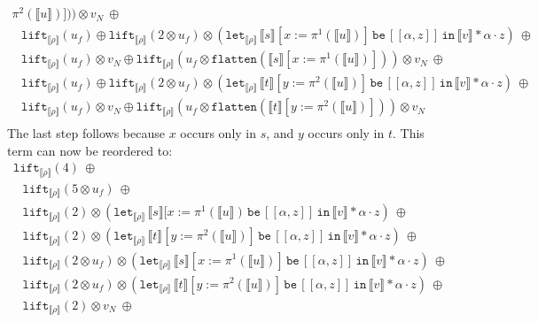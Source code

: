 \documentclass[runningheads,a4paper]{llncs}
\newcommand{\typeinterpret}[1]{\llbracket #1 \rrbracket}
\newcommand{\interpret}[1]{\llbracket #1 \rrbracket}
\newcommand{\expair}[2]{[#1,#2]}
\newcommand{\flatten}{\mathtt{flatten}}
\newcommand{\lift}{\mathtt{lift}}
\newcommand{\xlet}[4]{\mathtt{let}_{#1}\,#2\,\mathtt{be}\,[#3]\,\mathtt{in}\,#4}
\begin{document}
\begin{itemize}
\[\begin{array}{l}
    \pi^2(\interpret{u})])) \otimes v_N\ \oplus \\
  \phantom{A}
  \lift_{\typeinterpret{\rho}}(u_f) \oplus
    \lift_{\typeinterpret{\rho}}(2 \otimes u_f) \otimes
    (\xlet{\typeinterpret{\rho}}{\interpret{s}[x:=\pi^1(
    \interpret{u})]}{\expair{\alpha}{z}}{
      \interpret{v} * \alpha \cdot z})\ \oplus \\
  \phantom{A}
  \lift_{\typeinterpret{\rho}}(u_f) \otimes v_N \oplus
    \lift_{\typeinterpret{\rho}}(u_f \otimes
    \flatten(\interpret{s}[x:=\pi^1(\interpret{u})])) \otimes v_N\ 
    \oplus \\
  \phantom{A}
  \lift_{\typeinterpret{\rho}}(u_f) \oplus
    \lift_{\typeinterpret{\rho}}(2 \otimes u_f) \otimes
    (\xlet{\typeinterpret{\rho}}{\interpret{t}[y:=\pi^2(
    \interpret{u})]}{\expair{\alpha}{z}}{\interpret{v} * \alpha
    \cdot z})\ \oplus \\
  \phantom{A}
  \lift_{\typeinterpret{\rho}}(u_f) \otimes v_N \oplus
    \lift_{\typeinterpret{\rho}}(u_f \otimes\flatten(\interpret{t}[y:=
    \pi^2(\interpret{u})])) \otimes v_N \\
  \end{array}
  \]
  The last step follows because $x$ occurs only in $s$, and $y$ occurs
  only in $t$.  This term can now be reordered to:
  \[
  \begin{array}{l}
  \lift_{\typeinterpret{\rho}}(4)\ \oplus \\
  \phantom{A}
  \lift_{\typeinterpret{\rho}}(5 \otimes u_f)\ \oplus \\
  \phantom{A}
  \lift_{\typeinterpret{\rho}}(2) \otimes
  (\xlet{\typeinterpret{\rho}}{\interpret{s}[x:=\pi^1(\interpret{u})}{
    \expair{\alpha}{z}}{\interpret{v} * \alpha \cdot z})\ \oplus \\
  \phantom{A}
  \lift_{\typeinterpret{\rho}}(2) \otimes
    (\xlet{\typeinterpret{\rho}}{\interpret{t}[y:=\pi^2(\interpret{u})]}{
    \expair{\alpha}{z}}{\interpret{v} * \alpha \cdot z})\ \oplus \\
  \phantom{A}
    \lift_{\typeinterpret{\rho}}(2 \otimes u_f) \otimes
    (\xlet{\typeinterpret{\rho}}{\interpret{s}[x:=\pi^1(
    \interpret{u})]}{\expair{\alpha}{z}}{
    \interpret{v} * \alpha \cdot z})\ \oplus \\
  \phantom{A}
    \lift_{\typeinterpret{\rho}}(2 \otimes u_f) \otimes
    (\xlet{\typeinterpret{\rho}}{\interpret{t}[y:=\pi^2(
    \interpret{u})]}{\expair{\alpha}{z}}{
    \interpret{v} * \alpha \cdot z})\ \oplus \\
  \phantom{A}
  \lift_{\typeinterpret{\rho}}(2) \otimes v_N\ \oplus \\

\end{array}\]
\end{itemize}
\end{document}
